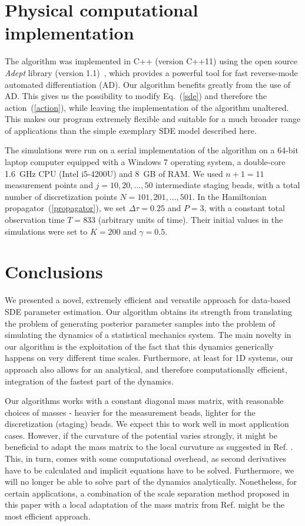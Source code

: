 \documentclass[11pt]{article}
\theoremstyle{definition}
\begin{document}
\section{Physical computational implementation}

The algorithm was implemented in C++ (version C++11) using the open source \emph{Adept} library (version 1.1)~\cite{Hogan_2014_adept}, which provides a powerful tool for fast reverse-mode automated differentiation (AD). Our algorithm benefits greatly from the use of AD. This gives us the possibility to modify Eq.~(\ref{sde}) and therefore the action~(\ref{action}), while leaving the implementation of the algorithm unaltered. This makes our program extremely flexible and suitable for a much broader range of applications than the simple exemplary SDE model described here.
%

The simulations were run on a serial implementation of the algorithm on a 64-bit laptop computer equipped with a Windows 7 operating system, a double-core 1.6~GHz CPU (Intel i5-4200U) and 8~GB of RAM. We used $n+1 = 11$ measurement points and $j = 10, 20,\dots, 50$ intermediate staging beads, with a total number of discretization points $N = 101, 201, \dots, 501$. In the Hamiltonian propagator~(\ref{propagator}), we set $\Delta\tau = 0.25$ and $P = 3$, with a constant total observation time $T = 833$ (arbitrary units of time).  Their initial values in the simulations were set to $K=200$ and $\gamma = 0.5$.
%



\section{Conclusions}

We presented a novel, extremely efficient and versatile approach for data-based SDE parameter estimation.
Our algorithm obtains its strength from translating the problem of generating posterior parameter samples into the problem of simulating the dynamics of a statistical mechanics system.
The main novelty in our algorithm is the exploitation of the fact that this dynamics generically happens on very different time scales.
Furthermore, at least for 1D systems, our approach also allows for an analytical, and therefore computationally efficient, integration of the fastest part of the dynamics.

Our algorithms works with a constant diagonal mass matrix, with reasonable choices of masses - heavier for the measurement beads, lighter for the discretization (staging) beads.
We expect this to work well in most application cases.
However, if the curvature of the potential varies strongly, it might be beneficial to adapt the mass matrix to the local curvature as suggested in Ref. \cite{girolami_2011_HMC}.
This, in turn, comes with some computational overhead, as second derivatives have to be calculated and implicit equations have to be solved.
Furthermore, we will no longer be able to solve part of the dynamics analytically.
Nonetheless, for certain applications, a combination of the scale separation method proposed in this paper with a local adaptation of the mass matrix from Ref. \cite{girolami_2011_HMC} might  be the most efficient approach.
\end{document}
